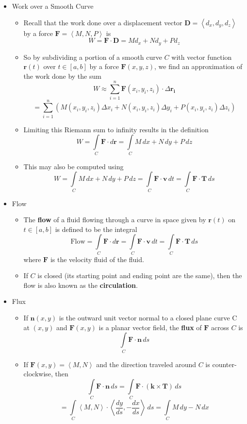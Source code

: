 \documentclass[12pt]{article}
\theoremstyle{plain}
\theoremstyle{definition}
\theoremstyle{remark}
\newcommand{\vect}[1]{\mathbf{#1}}
\newcommand{\veck}{\mathbf{k}}
\newcommand{\dvar}[1]{\,d{#1}}
\begin{document}
\begin{itemize}
	\item Work over a Smooth Curve
	
		\begin{itemize}
		\item Recall that the work done over a displacement vector $\vect{D}=\left<d_x,d_y,d_z\right>$ by a force $\vect{F}=\left<M,N,P\right>$ is \[W = \vect{F} \cdot \vect{D}=Md_x+Nd_y+Pd_z\]
		\item So by subdividing a portion of a smooth curve $C$ with vector function $\vect{r}(t)$ over $t\in[a,b]$ by a force $\vect{F}(x,y,z)$, we find an approximation of the work done by the sum \[W \approx \sum_{i=1}^n \vect{F}(x_i,y_i,z_i)\cdot\Delta\vect{r_i}\]\[ = \sum_{i=1}^n \left(M(x_i,y_i,z_i)\Delta x_i + N(x_i,y_i,z_i)\Delta y_i + P(x_i,y_i,z_i)\Delta z_i\right) \]
		\item Limiting this Riemann sum to infinity results in the definition \[W = \int\limits_C \vect{F}\cdot d\vect{r} = \int\limits_C M\,dx+N\,dy+P\,dz\]
		\item This may also be computed using \[W = \int\limits_C M\,dx+N\,dy+P\,dz = \int\limits_C \vect{F}\cdot\vect{v}\,dt = \int\limits_C \vect{F}\cdot \vect{T}\,ds\]
		\end{itemize}
		
	\item Flow
	
		\begin{itemize}
		\item The \textbf{flow} of a fluid flowing through a curve in space given by $\vect{r}(t)$ on $t\in[a,b]$ is defined to be the integral \[\textrm{Flow} = \int\limits_C \vect{F}\cdot d\vect{r} = \int\limits_C \vect{F}\cdot\vect{v}\,dt = \int\limits_C \vect{F}\cdot \vect{T}\,ds\] where $\vect{F}$ is the velocity fluid of the fluid.
		\item If $C$ is closed (its starting point and ending point are the same), then the flow is also known as the \textbf{circulation}.
		\end{itemize}
		
	\newpage
		
	\item Flux
	
		\begin{itemize}
		\item If $\vect{n}(x,y)$ is the outward unit vector normal to a closed plane curve C at $(x,y)$ and $\vect{F}(x,y)$ is a planar vector field, the \textbf{flux} of $\vect{F}$ across $C$ is \[\int\limits_C \vect{F}\cdot\vect{n}\,ds\]
		\item If $\vect{F}(x,y)=\left<M,N\right>$ and the direction traveled around $C$ is counter-clockwise, then \[\int\limits_C \vect{F}\cdot\vect{n}\dvar{s} = \int\limits_C \vect{F}\cdot(\veck\times\vect{T})\dvar{s} \]\[= \int\limits_C \left<M,N\right>\cdot\left<\frac{dy}{ds},-\frac{dx}{ds}\right>\dvar{s} = \int\limits_C M\dvar{y} - N\dvar{x}\]
		\end{itemize}
				

\end{itemize}
\end{document}
